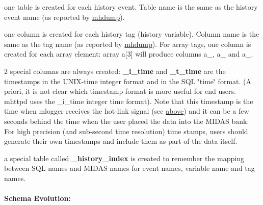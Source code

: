 \begin{DoxyItemize}
\item one table is created for each history event. Table name is the same as the history event name (as reported by \hyperlink{F_History_logging_F_mhdump_utility}{mhdump}). 
\item one column is created for each history tag (history variable). Column name is the same as the tag name (as reported by \hyperlink{F_History_logging_F_mhdump_utility}{mhdump}). For array tags, one column is created for each array element: array a\mbox{[}3\mbox{]} will produce columns a\_, a\_ and a\_. 
\item 2 special columns are always created: {\bfseries \_\-i\_\-time} and {\bfseries \_\-t\_\-time} are the timestamps in the UNIX-\/time integer format and in the SQL \char`\"{}time\char`\"{} format. (A priori, it is not clear which timestamp format is more useful for end users. mhttpd uses the \_\-i\_\-time integer time format). Note that this timestamp is the time when mlogger receives the hot-\/link signal (see \hyperlink{F_History_logging_F_history_hot_link}{above}) and it can be a few seconds behind the time when the user placed the data into the MIDAS bank. For high precision (and sub-\/second time resolution) time stamps, users should generate their own timestamps and include them as part of the data itself. 
\item a special table called {\bfseries \_\-history\_\-index} is created to remember the mapping between SQL names and MIDAS names for event names, variable name and tag names. 
\end{DoxyItemize}\hypertarget{F_History_logging_F_SQL_Schema}{}\paragraph{Schema Evolution:}\label{F_History_logging_F_SQL_Schema}


